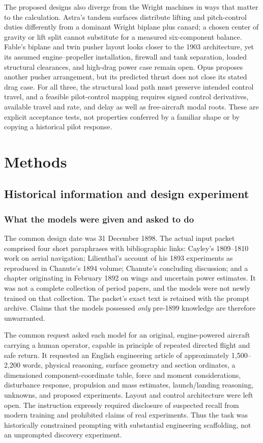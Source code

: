 \documentclass[11pt,a4paper]{article}
\begin{document}
The proposed designs also diverge from the Wright machines in ways that
matter to the calculation. Astra's tandem surfaces distribute lifting and
pitch-control duties differently from a dominant Wright biplane plus
canard; a chosen center of gravity or lift split cannot substitute for a
measured six-component balance. Fable's biplane and twin pusher layout
looks closer to the 1903 architecture, yet its assumed engine--propeller
installation, firewall and tank separation, loaded structural clearances,
and high-drag power case remain open. Opus proposes another pusher
arrangement, but its predicted thrust does not close its stated drag case.
For all three, the structural load path must preserve intended control
travel, and a feasible pilot-control mapping requires signed control
derivatives, available travel and rate, and delay as well as free-aircraft
modal roots. These are explicit acceptance tests, not properties conferred
by a familiar shape or by copying a historical pilot response.


\section{Methods}
\subsection{Historical information and design experiment}
\subsubsection{What the models were given and asked to do}
The common design date was 31 December 1898. The actual input packet comprised four short paraphrases with bibliographic links: Cayley's 1809--1810 work on aerial navigation; Lilienthal's account of his 1893 experiments as reproduced in Chanute's 1894 volume; Chanute's concluding discussion; and a chapter originating in February 1892 on wings and uncertain power estimates. It was not a complete collection of period papers, and the models were not newly trained on that collection. The packet's exact text is retained with the prompt archive. Claims that the models possessed \emph{only} pre-1899 knowledge are therefore unwarranted.

The common request asked each model for an original, engine-powered aircraft carrying a human operator, capable in principle of repeated directed flight and safe return. It requested an English engineering article of approximately 1,500--2,200 words, physical reasoning, surface geometry and section ordinates, a dimensioned component-coordinate table, force and moment considerations, disturbance response, propulsion and mass estimates, launch/landing reasoning, unknowns, and proposed experiments. Layout and control architecture were left open. The instruction expressly required disclosure of suspected recall from modern training and prohibited claims of real experiments. Thus the task was historically constrained prompting with substantial engineering scaffolding, not an unprompted discovery experiment.
\end{document}
